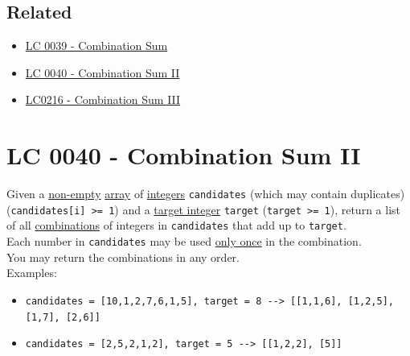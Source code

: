 \subsection*{Related}
\begin{itemize}
	\item \hyperref[lc0039]{LC 0039 - Combination Sum}
	\item \hyperref[lc0040]{LC 0040 - Combination Sum II}
	\item \hyperref[lc0216]{LC0216 - Combination Sum III}
\end{itemize}

\section{LC 0040 - Combination Sum II}\label{lc0040}
Given a \ul{non-empty} \ul{array} of \ul{integers} {\colorbox{CodeBackground}{\lstinline|candidates|}} (which may contain duplicates) ({\colorbox{CodeBackground}{\lstinline|candidates[i] >= 1|}}) and a \ul{target integer} {\colorbox{CodeBackground}{\lstinline|target|}} ({\colorbox{CodeBackground}{\lstinline|target >= 1|}}), return a list of all \ul{combinations} of integers in {\colorbox{CodeBackground}{\lstinline|candidates|}} that add up to {\colorbox{CodeBackground}{\lstinline|target|}}.\\

Each number in {\colorbox{CodeBackground}{\lstinline|candidates|}} may be used \ul{only once} in the combination.\\

You may return the combinations in any order.\\

Examples:
\begin{itemize}
	\item {\colorbox{CodeBackground}{\lstinline|candidates = [10,1,2,7,6,1,5], target = 8 --> [[1,1,6], [1,2,5], [1,7], [2,6]]|}}
	\item {\colorbox{CodeBackground}{\lstinline|candidates = [2,5,2,1,2], target = 5 --> [[1,2,2], [5]]|}}
\end{itemize}

